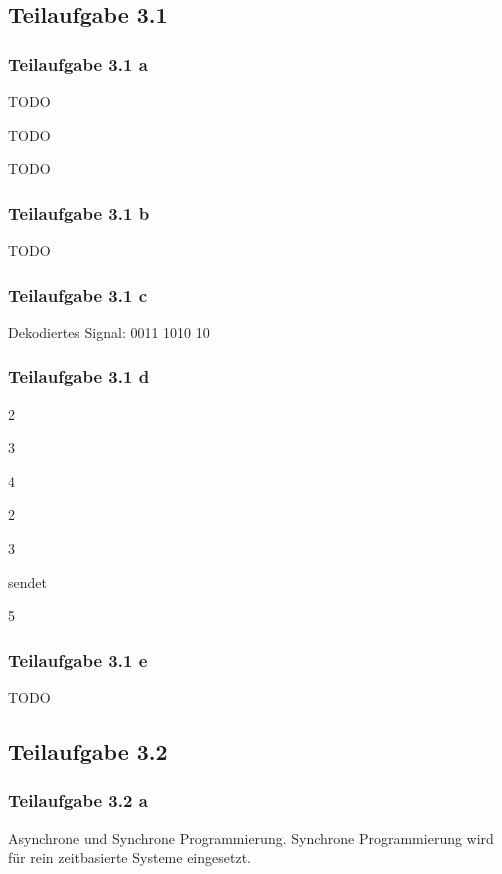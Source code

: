 \documentclass[a4paper]{scrartcl}
\begin{document}
  \subsection*{Teilaufgabe 3.1}
  \subsubsection*{Teilaufgabe 3.1 a}
  \begin{enumerate*}[label=(\arabic*)]
      \item TODO
      \item TODO
      \item TODO
  \end{enumerate*}

  \subsubsection*{Teilaufgabe 3.1 b}
  TODO

  \subsubsection*{Teilaufgabe 3.1 c}
  Dekodiertes Signal: 0011 1010 10

  \subsubsection*{Teilaufgabe 3.1 d}
  \begin{enumerate*}[label=(l\arabic*)]
      \item 2
      \item 3
      \item 4
      \item 2
      \item 3
      \item sendet
      \item 5
  \end{enumerate*}

  \subsubsection*{Teilaufgabe 3.1 e}
  TODO

  \subsection*{Teilaufgabe 3.2}
  \subsubsection*{Teilaufgabe 3.2 a}
  Asynchrone und Synchrone Programmierung.
  Synchrone Programmierung wird für rein zeitbasierte Systeme eingesetzt.
\end{document}
